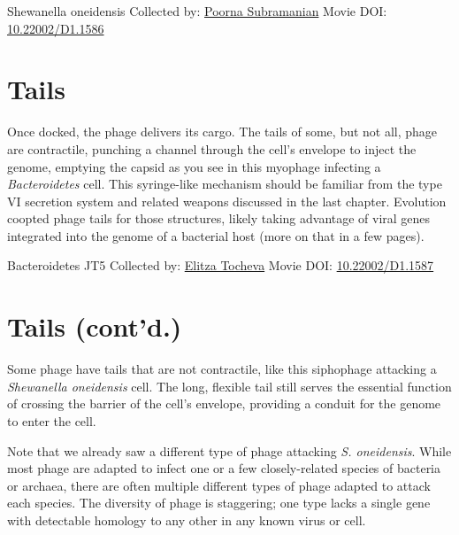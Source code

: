 \documentclass[]{tufte-book}
\begin{document}
\hypertarget{htmlwidget-54681103aa172cbaad8e}{}

\label{fig:10-1}Shewanella oneidensis Collected by: \protect\hyperlink{poorna_subramanian}{Poorna Subramanian} Movie DOI: \href{https://doi.org/10.22002/D1.1586}{10.22002/D1.1586}

\hypertarget{tails}{%
\section{Tails}\label{tails}}

Once docked, the phage delivers its cargo. The tails of some, but not all, phage are contractile, punching a channel through the cell's envelope to inject the genome, emptying the capsid as you see in this myophage infecting a \emph{Bacteroidetes} cell. This syringe-like mechanism should be familiar from the type VI secretion system and related weapons discussed in the last chapter. Evolution coopted phage tails for those structures, likely taking advantage of viral genes integrated into the genome of a bacterial host (more on that in a few pages).



\hypertarget{htmlwidget-d6198511925dde57c338}{}

\label{fig:10-2}Bacteroidetes JT5 Collected by: \protect\hyperlink{elitza_tocheva}{Elitza Tocheva} Movie DOI: \href{https://doi.org/10.22002/D1.1587}{10.22002/D1.1587}

\hypertarget{tails-contd.}{%
\section{Tails (cont'd.)}\label{tails-contd.}}

Some phage have tails that are not contractile, like this siphophage attacking a \emph{Shewanella oneidensis} cell. The long, flexible tail still serves the essential function of crossing the barrier of the cell's envelope, providing a conduit for the genome to enter the cell.

Note that we already saw a different type of phage attacking \emph{S. oneidensis}. While most phage are adapted to infect one or a few closely-related species of bacteria or archaea, there are often multiple different types of phage adapted to attack each species. The diversity of phage is staggering; one type lacks a single gene with detectable homology to any other in any known virus or cell.



\hypertarget{htmlwidget-48fd8c834531b3899e08}{}
\end{document}

